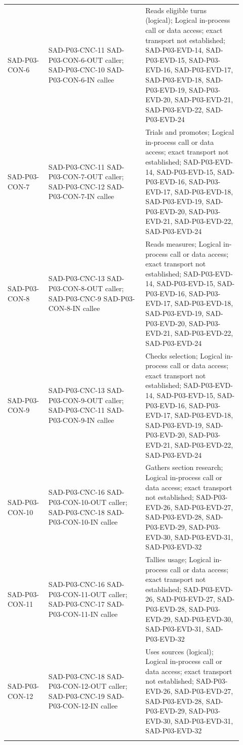 \documentclass[10pt,letterpaper]{article}
\begin{document}
\begin{longtable}{@{}>{\raggedright\arraybackslash}p{0.16\linewidth}>{\raggedright\arraybackslash}p{0.38\linewidth}>{\raggedright\arraybackslash}p{0.38\linewidth}@{}}
SAD-P03-CON-6 & SAD-P03-CNC-11 SAD-P03-CON-6-OUT caller; SAD-P03-CNC-10 SAD-P03-CON-6-IN callee & Reads eligible turns (logical); Logical in-process call or data access; exact transport not established; SAD-P03-EVD-14, SAD-P03-EVD-15, SAD-P03-EVD-16, SAD-P03-EVD-17, SAD-P03-EVD-18, SAD-P03-EVD-19, SAD-P03-EVD-20, SAD-P03-EVD-21, SAD-P03-EVD-22, SAD-P03-EVD-24\\\addlinespace
SAD-P03-CON-7 & SAD-P03-CNC-11 SAD-P03-CON-7-OUT caller; SAD-P03-CNC-12 SAD-P03-CON-7-IN callee & Trials and promotes; Logical in-process call or data access; exact transport not established; SAD-P03-EVD-14, SAD-P03-EVD-15, SAD-P03-EVD-16, SAD-P03-EVD-17, SAD-P03-EVD-18, SAD-P03-EVD-19, SAD-P03-EVD-20, SAD-P03-EVD-21, SAD-P03-EVD-22, SAD-P03-EVD-24\\\addlinespace
SAD-P03-CON-8 & SAD-P03-CNC-13 SAD-P03-CON-8-OUT caller; SAD-P03-CNC-9 SAD-P03-CON-8-IN callee & Reads measures; Logical in-process call or data access; exact transport not established; SAD-P03-EVD-14, SAD-P03-EVD-15, SAD-P03-EVD-16, SAD-P03-EVD-17, SAD-P03-EVD-18, SAD-P03-EVD-19, SAD-P03-EVD-20, SAD-P03-EVD-21, SAD-P03-EVD-22, SAD-P03-EVD-24\\\addlinespace
SAD-P03-CON-9 & SAD-P03-CNC-13 SAD-P03-CON-9-OUT caller; SAD-P03-CNC-11 SAD-P03-CON-9-IN callee & Checks selection; Logical in-process call or data access; exact transport not established; SAD-P03-EVD-14, SAD-P03-EVD-15, SAD-P03-EVD-16, SAD-P03-EVD-17, SAD-P03-EVD-18, SAD-P03-EVD-19, SAD-P03-EVD-20, SAD-P03-EVD-21, SAD-P03-EVD-22, SAD-P03-EVD-24\\\addlinespace
SAD-P03-CON-10 & SAD-P03-CNC-16 SAD-P03-CON-10-OUT caller; SAD-P03-CNC-18 SAD-P03-CON-10-IN callee & Gathers section research; Logical in-process call or data access; exact transport not established; SAD-P03-EVD-26, SAD-P03-EVD-27, SAD-P03-EVD-28, SAD-P03-EVD-29, SAD-P03-EVD-30, SAD-P03-EVD-31, SAD-P03-EVD-32\\\addlinespace
SAD-P03-CON-11 & SAD-P03-CNC-16 SAD-P03-CON-11-OUT caller; SAD-P03-CNC-17 SAD-P03-CON-11-IN callee & Tallies usage; Logical in-process call or data access; exact transport not established; SAD-P03-EVD-26, SAD-P03-EVD-27, SAD-P03-EVD-28, SAD-P03-EVD-29, SAD-P03-EVD-30, SAD-P03-EVD-31, SAD-P03-EVD-32\\\addlinespace
SAD-P03-CON-12 & SAD-P03-CNC-18 SAD-P03-CON-12-OUT caller; SAD-P03-CNC-19 SAD-P03-CON-12-IN callee & Uses sources (logical); Logical in-process call or data access; exact transport not established; SAD-P03-EVD-26, SAD-P03-EVD-27, SAD-P03-EVD-28, SAD-P03-EVD-29, SAD-P03-EVD-30, SAD-P03-EVD-31, SAD-P03-EVD-32\\\addlinespace
\bottomrule\end{longtable}
\end{document}
